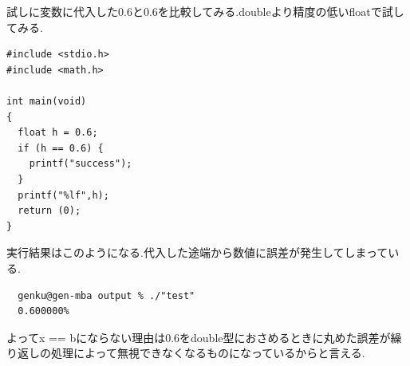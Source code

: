 \documentclass[a4j,10pt,dvipdfmx]{jarticle}
\begin{document}
試しに変数に代入した0.6と0.6を比較してみる.doubleより精度の低いfloatで試してみる.
\begin{lstlisting}[label=sam3, caption=sample3.c]
#include <stdio.h>
#include <math.h>

int main(void)
{
  float h = 0.6;
  if (h == 0.6) {
    printf("success");
  }
  printf("%lf",h);
  return (0);
}
\end{lstlisting}
実行結果はこのようになる.代入した途端から数値に誤差が発生してしまっている.
\begin{verbatim}
  genku@gen-mba output % ./"test"
  0.600000%     
\end{verbatim}
よってx == bにならない理由は0.6をdouble型におさめるときに丸めた誤差が繰り返しの処理によって無視できなくなるものになっているからと言える.
\end{document}
